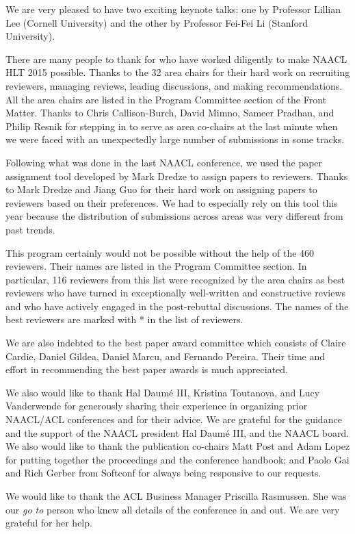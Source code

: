 We are very pleased to have two exciting keynote talks: one by
Professor Lillian Lee (Cornell University) and the other by Professor
Fei-Fei Li (Stanford University).

There are many people to thank for who have worked diligently to
make NAACL HLT 2015 possible. Thanks to the 32 area chairs
for their hard work on recruiting reviewers, managing reviews,
leading discussions, and making recommendations.  All the area
chairs are listed in the Program Committee section of the Front
Matter.  Thanks to Chris Callison-Burch, David Mimno,
Sameer Pradhan, and Philip Resnik for stepping in to serve as area
co-chairs at the last minute when we were faced with an unexpectedly
large number of submissions in some tracks.

Following what was done in the last NAACL conference, we used the
paper assignment tool developed by Mark Dredze to assign papers to
reviewers.  Thanks to Mark Dredze and Jiang Guo for
their hard work on assigning papers to reviewers based on their
preferences.  We had to especially rely on this tool this year
because the distribution of submissions across areas was very
different from past trends.

This program certainly would not be possible without the help of
the 460 reviewers. Their names are listed in the Program Committee
section.  In particular, 116 reviewers from this list were recognized
by the area chairs as best reviewers who have turned in exceptionally
well-written and constructive reviews and who have actively engaged in
the post-rebuttal discussions. The names of the best reviewers are
marked with * in the list of reviewers. 

We are also indebted to the best paper award committee which consists
of Claire Cardie, Daniel Gildea, Daniel Marcu, and Fernando Pereira.
Their time and effort in recommending the best paper awards is much
appreciated.

We also would like to thank Hal Daum\'{e} III, Kristina Toutanova,
and Lucy Vanderwende for generously sharing their experience in
organizing prior NAACL/ACL conferences and for their advice. We are
grateful for the guidance and the support of the NAACL president
Hal Daum\'{e} III, and the NAACL board. We also would like to thank
the publication co-chairs Matt Post and Adam Lopez for putting
together the proceedings and the conference handbook; and Paolo Gai
and Rich Gerber from Softconf for always being responsive to our
requests. 

We would like to thank the ACL Business Manager Priscilla Rasmussen.
She was our {\em go to} person who knew all details of the conference
in and out.  We are very grateful for her help.

